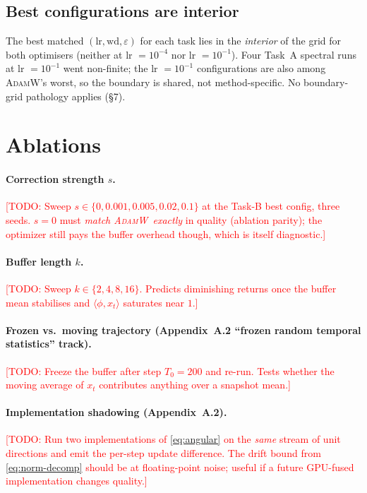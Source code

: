 \documentclass{article}
\newcommand{\todo}[1]{\textcolor{red}{[TODO: #1]}}
\newcommand{\Adamw}{\textsc{AdamW}}
\begin{document}
\subsection{Best configurations are interior}
The best matched $(\text{lr},\text{wd},\varepsilon)$ for each task
lies in the \emph{interior} of the grid for both optimisers
(neither at lr $=10^{-4}$ nor lr $=10^{-1}$).  Four Task~A spectral
runs at lr $=10^{-1}$ went non-finite; the lr $=10^{-1}$
configurations are also among \Adamw's worst, so the boundary is
shared, not method-specific.  No boundary-grid pathology applies (§7).

\section{Ablations}

\paragraph{Correction strength $s$.}\todo{
Sweep $s \in \{0, 0.001, 0.005, 0.02, 0.1\}$ at the Task-B best
config, three seeds.  $s = 0$ must \emph{match \Adamw\ exactly} in
quality (ablation parity); the optimizer still pays the buffer
overhead though, which is itself diagnostic.}

\paragraph{Buffer length $k$.}\todo{Sweep
$k\in\{2,4,8,16\}$.  Predicts diminishing returns once the buffer
mean stabilises and $\langle\phi,x_t\rangle$ saturates near $1$.}

\paragraph{Frozen vs.\ moving trajectory (Appendix~A.2 ``frozen
random temporal statistics'' track).}\todo{
Freeze the buffer after step $T_0=200$ and re-run.  Tests whether
the moving average of $x_t$ contributes anything over a snapshot
mean.}

\paragraph{Implementation shadowing (Appendix~A.2).}\todo{
Run two implementations of \eqref{eq:angular} on the \emph{same}
stream of unit directions and emit the per-step update difference.
The drift bound from \eqref{eq:norm-decomp} should be at
floating-point noise; useful if a future GPU-fused implementation
changes quality.}
\end{document}
